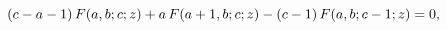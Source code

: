 \[(c-a-1)\mathop{F\/}\nolimits\!\left(a,b;c;z\right)+a\mathop{F\/}\nolimits\!%
\left(a+1,b;c;z\right)-(c-1)\mathop{F\/}\nolimits\!\left(a,b;c-1;z\right)=0,\]